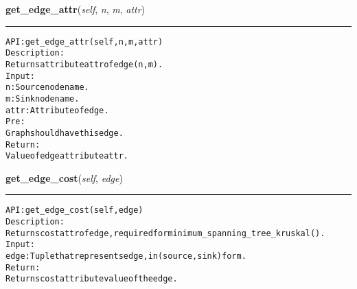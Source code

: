     \label{coinor:gimpy:graph:Graph:get_edge_attr}

    \vspace{0.5ex}

\hspace{.8\funcindent}\begin{boxedminipage}{\funcwidth}

    \raggedright \textbf{get\_edge\_attr}(\textit{self}, \textit{n}, \textit{m}, \textit{attr})

    \vspace{-1.5ex}

    \rule{\textwidth}{0.5\fboxrule}
\setlength{\parskip}{2ex}
\begin{alltt}

API: get\_edge\_attr(self, n, m, attr)
Description:
Returns attribute attr of edge (n,m).
Input:
    n: Source node name.
    m: Sink node name.
    attr: Attribute of edge.
Pre:
    Graph should have this edge.
Return:
    Value of edge attribute attr.
\end{alltt}

\setlength{\parskip}{1ex}
    \end{boxedminipage}

    \label{coinor:gimpy:graph:Graph:get_edge_cost}

    \vspace{0.5ex}

\hspace{.8\funcindent}\begin{boxedminipage}{\funcwidth}

    \raggedright \textbf{get\_edge\_cost}(\textit{self}, \textit{edge})

    \vspace{-1.5ex}

    \rule{\textwidth}{0.5\fboxrule}
\setlength{\parskip}{2ex}
\begin{alltt}

API: get\_edge\_cost(self, edge)
Description:
Returns cost attr of edge, required for minimum\_spanning\_tree\_kruskal().
Input:
    edge: Tuple that represents edge, in (source,sink) form.
Return:
    Returns cost attribute value of the edge.
\end{alltt}

\setlength{\parskip}{1ex}
    \end{boxedminipage}

